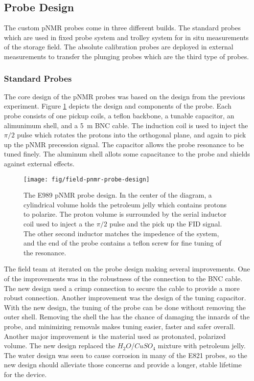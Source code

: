 \subsection{Probe Design}

The custom pNMR probes come in three different builds.  The standard probes which are used in fixed probe system and trolley system for in situ measurements of the storage field.  The absolute calibration probes are deployed in external measurements to transfer the plunging probes which are the third type of probes.

\subsubsection{Standard Probes}

The core design of the pNMR probes was based on the design from the previous experiment. Figure \ref{fig:field-pnmr-probe-design} depicts the design and components of the probe.  Each probe consists of one pickup coils, a teflon backbone, a tunable capacitor, an alimunimum shell, and a \SI{5}{\meter} BNC cable.  The induction coil is used to inject the $\pi/2$ pulse which rotates the protons into the orthogonal plane, and again to pick up the pNMR precession signal.  The capacitor allows the probe resonance to be tuned finely.  The aluminum shell allots some capacitance to the probe and shields against external effects.

\begin{figure}
\label{fig:field-pnmr-probe-design}
\texttt{[image: fig/field-pnmr-probe-design]}
\caption{The E989 pNMR probe design.  In the center of the diagram, a cylindrical volume holds the petroleum jelly which contains protons to polarize.  The proton volume is surrounded by the serial inductor coil used to inject a the $\pi/2$ pulse and the pick up the FID signal.  The other second inductor matches the impedence of the system, and the end of the probe contains a teflon screw for fine tuning of the resonance.}
\end{figure}

The field team at \uw iterated on the probe design making several improvements.  One of the improvements was in the robustness of the connection to the BNC cable.  The new design used a crimp connection to secure the cable to provide a more robust connection.  Another improvement was the design of the tuning capacitor.  With the new design, the tuning of the probe can be done without removing the outer shell.  Removing the shell the has the chance of damaging the innards of the probe, and minimizing removals makes tuning easier, faster and safer overall.  Another major improvement is the material used as protonated, polarized volume.  The new design replaced the $H_2O$/$CuSO_4$ mixture with petroleum jelly.  The water design was seen to cause corrosion in many of the E821 probes, so the new design should alleviate those concerns and provide a longer, stable lifetime for the device.

